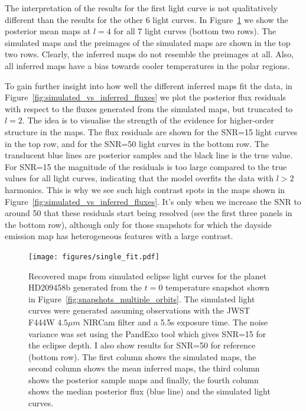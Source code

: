 \documentclass[12pt,dvipsnames]{report}
\begin{document}
The interpretation of the results for the first light curve is not qualitatively different 
than the results for the other 6 light curves. In Figure~\ref{fig:single_fit} we show the 
posterior mean maps at $l=4$ for all 7 light curves (bottom two rows).
The simulated maps and the preimages of the simulated maps are shown in the top two rows. 
Clearly, the inferred maps do not resemble the preimages at all. Also, all inferred maps
have a bias towards cooler temperatures in the polar regions. 

To gain further insight into how well the different inferred maps fit the data, in 
Figure~\ref{fig:simulated_vs_inferred_fluxes} we plot the posterior 
flux residuals with respect to the fluxes generated from the simulated maps, but truncated 
to $l=2$. 
The idea is to visualise the strength of the evidence for higher-order
structure in the maps. The flux residuals are shown for the SNR=15 light curves in the top row,
and for the SNR=50 light curves in the bottom row. The translucent blue lines are posterior 
samples and the black line is the true value. For SNR=15 the magnitude of the residuals is 
too large compared to the true values for all light curves, indicating that the model overfits 
the data with $l>2$ harmonics. This is why we see such high contrast spots in the maps shown 
in Figure~\ref{fig:simulated_vs_inferred_fluxes}. It's only when we increase the SNR to around 
50 that these residuals start being resolved (see the first three panels in the bottom row), 
although only for those snapshots for which the dayside emission map has heterogeneous features with 
a large contrast.

\begin{figure}[t!]
    \begin{centering}
        \texttt{[image: figures/single\_fit.pdf]}
        \caption{
            Recovered maps from simulated eclipse light curves for the planet HD209458b
            generated from the $t=0$ temperature snapshot shown in 
            Figure~\ref{fig:snapshots_multiple_orbits}.
            The simulated light curves were generated assuming observations with 
            the JWST F444W $4.5\mu m$ NIRCam filter and a 5.5s exposure time. The noise 
            variance was set using the PandExo tool which gives SNR=15 for the eclipse depth.
            I also show results for SNR=50 for reference (bottom row).
            The first column shows the simulated maps, the second column shows the mean 
            inferred maps, the third column shows the posterior sample maps and finally,
            the fourth column shows the median posterior flux (blue line) and the simulated
            light curves.
        }
        \label{fig:single_fit}
    \end{centering}
\end{figure}
\end{document}
